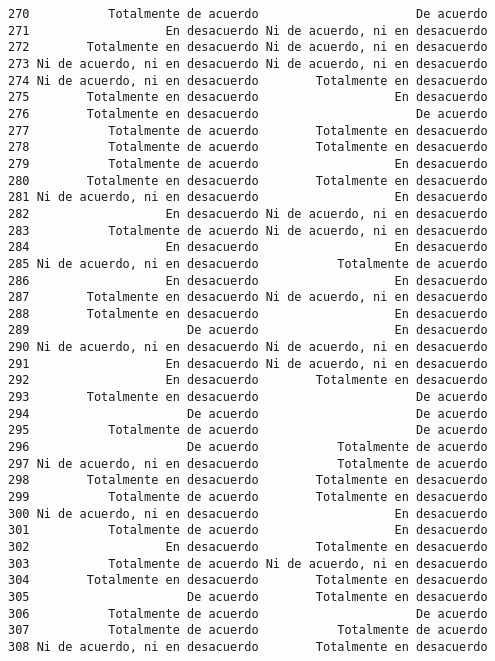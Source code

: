 \documentclass[
  letterpaper,
  DIV=11,
  numbers=noendperiod]{scrartcl}
\begin{document}
\begin{verbatim}
270           Totalmente de acuerdo                      De acuerdo
271                   En desacuerdo Ni de acuerdo, ni en desacuerdo
272        Totalmente en desacuerdo Ni de acuerdo, ni en desacuerdo
273 Ni de acuerdo, ni en desacuerdo Ni de acuerdo, ni en desacuerdo
274 Ni de acuerdo, ni en desacuerdo        Totalmente en desacuerdo
275        Totalmente en desacuerdo                   En desacuerdo
276        Totalmente en desacuerdo                      De acuerdo
277           Totalmente de acuerdo        Totalmente en desacuerdo
278           Totalmente de acuerdo        Totalmente en desacuerdo
279           Totalmente de acuerdo                   En desacuerdo
280        Totalmente en desacuerdo        Totalmente en desacuerdo
281 Ni de acuerdo, ni en desacuerdo                   En desacuerdo
282                   En desacuerdo Ni de acuerdo, ni en desacuerdo
283           Totalmente de acuerdo Ni de acuerdo, ni en desacuerdo
284                   En desacuerdo                   En desacuerdo
285 Ni de acuerdo, ni en desacuerdo           Totalmente de acuerdo
286                   En desacuerdo                   En desacuerdo
287        Totalmente en desacuerdo Ni de acuerdo, ni en desacuerdo
288        Totalmente en desacuerdo                   En desacuerdo
289                      De acuerdo                   En desacuerdo
290 Ni de acuerdo, ni en desacuerdo Ni de acuerdo, ni en desacuerdo
291                   En desacuerdo Ni de acuerdo, ni en desacuerdo
292                   En desacuerdo        Totalmente en desacuerdo
293        Totalmente en desacuerdo                      De acuerdo
294                      De acuerdo                      De acuerdo
295           Totalmente de acuerdo                      De acuerdo
296                      De acuerdo           Totalmente de acuerdo
297 Ni de acuerdo, ni en desacuerdo           Totalmente de acuerdo
298        Totalmente en desacuerdo        Totalmente en desacuerdo
299           Totalmente de acuerdo        Totalmente en desacuerdo
300 Ni de acuerdo, ni en desacuerdo                   En desacuerdo
301           Totalmente de acuerdo                   En desacuerdo
302                   En desacuerdo        Totalmente en desacuerdo
303           Totalmente de acuerdo Ni de acuerdo, ni en desacuerdo
304        Totalmente en desacuerdo        Totalmente en desacuerdo
305                      De acuerdo        Totalmente en desacuerdo
306           Totalmente de acuerdo                      De acuerdo
307           Totalmente de acuerdo           Totalmente de acuerdo
308 Ni de acuerdo, ni en desacuerdo        Totalmente en desacuerdo

\end{verbatim}
\end{document}
